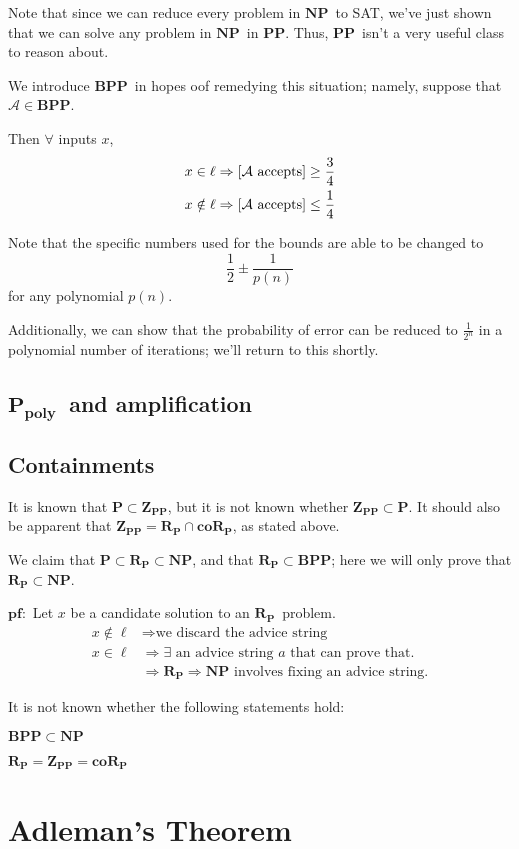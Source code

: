 \documentclass[11pt]{article}
\let\Pr\relax
\DeclareMathOperator*{\Pr}{\mathbb{P}}
\newcommand{\Pt}{\ensuremath{\mathbf{P}}}
\newcommand{\NP}{\ensuremath{\mathbf{NP}}}
\newcommand{\PP}{\ensuremath{\mathbf{PP}}}
\newcommand{\BPP}{\ensuremath{\mathbf{BPP}}}
\newcommand{\ZPP}{\ensuremath{\mathbf{Z_{PP}}}}
\newcommand{\RP}{\ensuremath{\mathbf{R_{P}}}}
\newcommand{\coRP}{\ensuremath{\mathbf{coR_{P}}}}
\newcommand{\Ppoly}{\ensuremath{\mathbf{P_{poly}}}}
\newcommand{\Alg}{\ensuremath{\mathcal{A}}}
\begin{document}
Note that since we can reduce every problem in \NP\ to SAT, we've just shown that we can solve any problem in \NP\ in \PP. Thus, \PP\ isn't a very useful class to reason about.

We introduce \BPP\ in hopes oof remedying this situation; namely, suppose that $\Alg\in\BPP$.

Then $\forall$ inputs $x$,
\begin{align*}
  x \in \ell &\Rightarrow \Pr[\Alg \text{ accepts}] \geq \frac{3}{4} \\
  x \notin \ell &\Rightarrow \Pr[\Alg \text{ accepts}] \leq \frac{1}{4}
\end{align*}

Note that the specific numbers used for the bounds are able to be changed to
$$\frac{1}{2} \pm \frac{1}{p(n)}$$
for any polynomial $p(n)$.

Additionally, we can show that the probability of error can be reduced to $\frac{1}{2^n}$ in a polynomial number of iterations; we'll return to this shortly.

\subsection{\Ppoly\ and amplification}

\subsection{Containments}

It is known that $\Pt\subset\ZPP$, but it is not known whether $\ZPP\subset\Pt$.
It should also be apparent that $\ZPP = \RP\cap\coRP$, as stated above.

We claim that $\Pt\subset\RP\subset\NP$, and that $\RP\subset\BPP$; here we will only prove that $\RP\subset\NP$.

$\mathbf{pf: }$
Let $x$ be a candidate solution to an \RP\ problem.
\begin{align*}
  x\notin\ell &\Rightarrow \text{we discard the advice string}\\
  x\in\ell &\Rightarrow \exists\text{ an advice string $a$ that can prove that.}\\
  &\Rightarrow \RP \Rightarrow \NP \text{ involves fixing an advice string.}
\end{align*}

It is not known whether the following statements hold:

$\BPP\subset\NP$

$\RP=\ZPP=\coRP$

\section{Adleman's Theorem}



\begin{thebibliography}{42}


\end{thebibliography}
\end{document}

